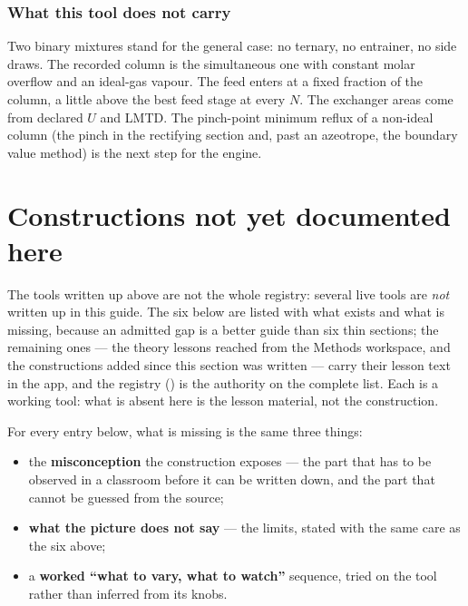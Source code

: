 \documentclass[11pt,a4paper]{article}
\begin{document}
\subsubsection*{What this tool does not carry}

Two binary mixtures stand for the general case: no ternary, no entrainer, no
side draws.  The recorded column is the simultaneous one with constant molar
overflow and an ideal-gas vapour.  The feed enters at a fixed fraction of the
column, a little above the best feed stage at every $N$.  The exchanger areas
come from declared $U$ and LMTD.  The pinch-point minimum reflux of a non-ideal
column (the pinch in the rectifying section and, past an azeotrope, the boundary
value method) is the next step for the engine.

\section{Constructions not yet documented here}\label{sec:edu-stubs}

The tools written up above are not the whole registry: several live tools
are \emph{not} written up in this guide.  The six below are listed with
what exists and what is missing, because an admitted gap is a better guide
than six thin sections; the remaining ones --- the theory lessons reached
from the Methods workspace, and the constructions added since this section
was written --- carry their lesson text in the app, and the registry
() is the authority on the complete
list.  Each is a working tool: what is absent here is the lesson material,
not the construction.

For every entry below, what is missing is the same three things:

\begin{itemize}[leftmargin=*,nosep,topsep=2pt]
  \item the \textbf{misconception} the construction exposes --- the part
        that has to be observed in a classroom before it can be written
        down, and the part that cannot be guessed from the source;
  \item \textbf{what the picture does not say} --- the limits, stated
        with the same care as the six above;
  \item a \textbf{worked ``what to vary, what to watch''} sequence, tried
        on the tool rather than inferred from its knobs.
\end{itemize}
\end{document}
